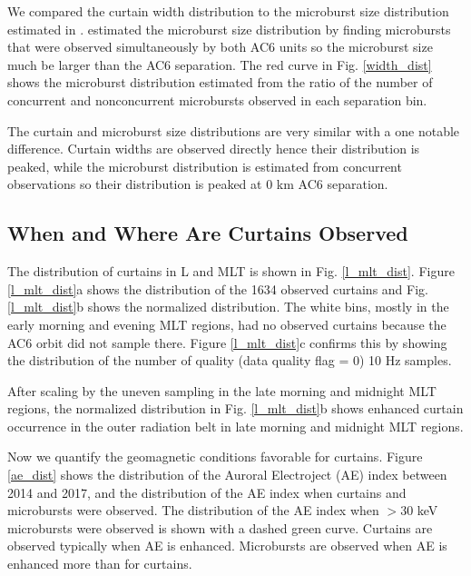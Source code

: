 \documentclass[draft]{agujournal2019}
\begin{document}
We compared the curtain width distribution to the microburst size distribution estimated in .  estimated the microburst size distribution by finding microbursts that were observed simultaneously by both AC6 units so the microburst size much be larger than the AC6 separation. The red curve in Fig. \ref{width_dist} shows the microburst distribution estimated from the ratio of the number of concurrent and nonconcurrent microbursts observed in each separation bin. 

The curtain and microburst size distributions are very similar with a one notable difference. Curtain widths are observed directly hence their distribution is peaked, while the microburst distribution is estimated from concurrent observations so their distribution is peaked at 0 km AC6 separation.

\subsection{When and Where Are Curtains Observed}
The distribution of curtains in L and MLT is shown in Fig. \ref{l_mlt_dist}. Figure \ref{l_mlt_dist}a shows the distribution of the 1634 observed curtains and Fig. \ref{l_mlt_dist}b shows the normalized distribution. The white bins, mostly in the early morning and evening MLT regions, had no observed curtains because the AC6 orbit did not sample there. Figure \ref{l_mlt_dist}c confirms this by showing the distribution of the number of quality (data quality flag = 0) 10 Hz samples.

After scaling by the uneven sampling in the late morning and midnight MLT regions, the normalized distribution in Fig. \ref{l_mlt_dist}b shows enhanced curtain occurrence in the outer radiation belt in late morning and midnight MLT regions.

Now we quantify the geomagnetic conditions favorable for curtains. Figure \ref{ae_dist} shows the distribution of the Auroral Electroject (AE) index between 2014 and 2017, and the distribution of the AE index when curtains and microbursts were observed. The distribution of the AE index when $> 30$ keV microbursts were observed is shown with a dashed green curve. Curtains are observed typically when AE is enhanced. Microbursts are observed when AE is enhanced more than for curtains.
\end{document}
